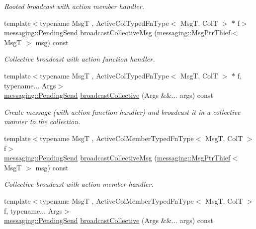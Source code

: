 \begin{DoxyCompactItemize}
\begin{DoxyCompactList}\small\item\em Rooted broadcast with action member handler. \end{DoxyCompactList}\item 
{\footnotesize template$<$typename MsgT , Active\+Col\+Typed\+Fn\+Type$<$ Msg\+T, Col\+T $>$ $\ast$ f$>$ }\\\hyperlink{structvt_1_1messaging_1_1_pending_send}{messaging\+::\+Pending\+Send} \hyperlink{structvt_1_1vrt_1_1collection_1_1_broadcastable_a70ec0f06ef5566c713a4d960a8faa39b}{broadcast\+Collective\+Msg} (\hyperlink{structvt_1_1messaging_1_1_msg_ptr_thief}{messaging\+::\+Msg\+Ptr\+Thief}$<$ MsgT $>$ msg) const
\begin{DoxyCompactList}\small\item\em Collective broadcast with action function handler. \end{DoxyCompactList}\item 
{\footnotesize template$<$typename MsgT , Active\+Col\+Typed\+Fn\+Type$<$ Msg\+T, Col\+T $>$ $\ast$ f, typename... Args$>$ }\\\hyperlink{structvt_1_1messaging_1_1_pending_send}{messaging\+::\+Pending\+Send} \hyperlink{structvt_1_1vrt_1_1collection_1_1_broadcastable_acef03dd57082f32556bef0e536a07fe9}{broadcast\+Collective} (Args \&\&... args) const
\begin{DoxyCompactList}\small\item\em Create message (with action function handler) and broadcast it in a collective manner to the collection. \end{DoxyCompactList}\item 
{\footnotesize template$<$typename MsgT , Active\+Col\+Member\+Typed\+Fn\+Type$<$ Msg\+T, Col\+T $>$ f$>$ }\\\hyperlink{structvt_1_1messaging_1_1_pending_send}{messaging\+::\+Pending\+Send} \hyperlink{structvt_1_1vrt_1_1collection_1_1_broadcastable_a70ec0f06ef5566c713a4d960a8faa39b}{broadcast\+Collective\+Msg} (\hyperlink{structvt_1_1messaging_1_1_msg_ptr_thief}{messaging\+::\+Msg\+Ptr\+Thief}$<$ MsgT $>$ msg) const
\begin{DoxyCompactList}\small\item\em Collective broadcast with action member handler. \end{DoxyCompactList}\item 
{\footnotesize template$<$typename MsgT , Active\+Col\+Member\+Typed\+Fn\+Type$<$ Msg\+T, Col\+T $>$ f, typename... Args$>$ }\\\hyperlink{structvt_1_1messaging_1_1_pending_send}{messaging\+::\+Pending\+Send} \hyperlink{structvt_1_1vrt_1_1collection_1_1_broadcastable_acef03dd57082f32556bef0e536a07fe9}{broadcast\+Collective} (Args \&\&... args) const

\end{DoxyCompactItemize}
